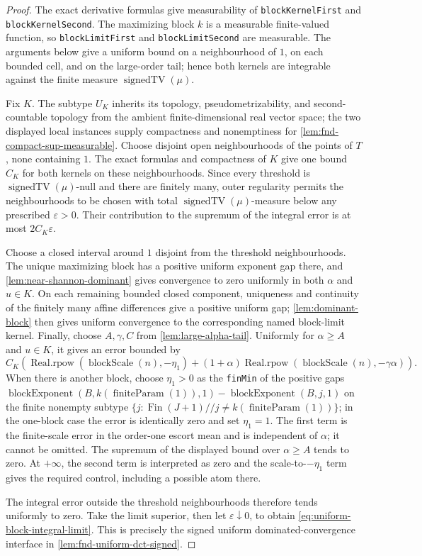\documentclass[9pt]{extarticle}
\theoremstyle{definition}
\theoremstyle{remark}
\begin{document}
\begin{proof}
The exact derivative formulas give measurability of
\texttt{blockKernelFirst} and \texttt{blockKernelSecond}.
The maximizing block $k$ is a measurable finite-valued function, so
\texttt{blockLimitFirst} and \texttt{blockLimitSecond} are measurable.
The arguments below give a
uniform bound on a neighbourhood of $1$, on each bounded cell, and on the
large-order tail; hence both kernels are integrable against the finite
measure $\operatorname{signedTV}(\mu)$.

Fix $K$.  The subtype $U_K$ inherits its topology, pseudometrizability, and
second-countable topology from the ambient finite-dimensional real vector
space; the two displayed local instances supply compactness and nonemptiness
for \cref{lem:fnd-compact-sup-measurable}.  Choose disjoint open
neighbourhoods of the points of $T$, none
containing $1$.  The exact formulas and compactness of $K$ give one bound
$C_K$ for both kernels on these neighbourhoods.  Since every threshold is
$\operatorname{signedTV}(\mu)$-null and there are finitely many, outer regularity permits the
neighbourhoods to be chosen with total $\operatorname{signedTV}(\mu)$-measure below any prescribed
$\varepsilon>0$.  Their contribution to the supremum of the integral error
is at most $2C_K\varepsilon$.

Choose a closed interval around $1$ disjoint from the threshold
neighbourhoods.  The unique maximizing block has a positive uniform exponent
gap there, and \cref{lem:near-shannon-dominant} gives convergence to zero
uniformly in both $\alpha$ and $u\in K$.  On each remaining bounded closed
component, uniqueness and continuity of the finitely many affine differences
give a positive uniform gap; \cref{lem:dominant-block} then gives uniform
convergence to the corresponding named block-limit kernel.  Finally, choose
$A,\gamma,C$ from \cref{lem:large-alpha-tail}.  Uniformly for
$\alpha\geq A$ and $u\in K$, it gives
an error bounded by
\[
 C_K\left(\operatorname{Real.rpow}
   (\operatorname{blockScale}(n),-\eta_1)
 +(1+\alpha)\operatorname{Real.rpow}
   (\operatorname{blockScale}(n),-\gamma\alpha)\right).
\]
When there is another block, choose $\eta_1>0$ as the \texttt{finMin} of
the positive gaps
$\operatorname{blockExponent}(B,k(\operatorname{finiteParam}(1)),1)
-\operatorname{blockExponent}(B,j,1)$ on the finite nonempty subtype
$\{j:\operatorname{Fin}(J+1)\mathbin{//}
  j\neq k(\operatorname{finiteParam}(1))\}$; in the one-block case
the error is identically zero and set $\eta_1=1$.
The first term is the finite-scale error in the order-one escort mean and is
independent of $\alpha$; it cannot be omitted.  The supremum of the displayed
bound over $\alpha\geq A$ tends to zero.  At $+\infty$, the second term is
interpreted as zero and the scale-to-$-\eta_1$ term gives the required control,
including a possible atom there.

The integral error outside the threshold neighbourhoods therefore tends
uniformly to zero.  Take the limit superior, then let $\varepsilon\downarrow
0$, to obtain \cref{eq:uniform-block-integral-limit}.  This is precisely the
signed uniform dominated-convergence interface in
\cref{lem:fnd-uniform-dct-signed}.
\end{proof}
\end{document}
